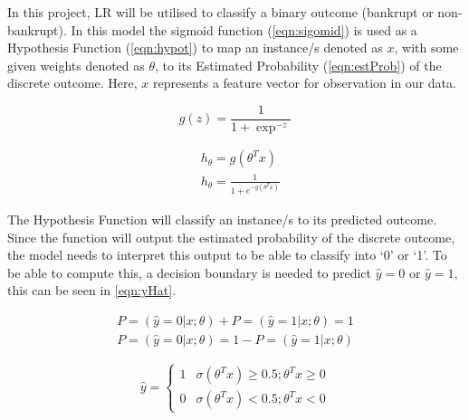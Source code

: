 In this project, LR will be utilised to classify a binary outcome (bankrupt or non-bankrupt). In this model the sigmoid function (\autoref{eqn:sigomid}) is used as a Hypothesis Function (\autoref{eqn:hypot}) to map an instance/s denoted as $x$, with some given weights denoted as $\theta$, to its Estimated Probability (\autoref{eqn:estProb}) of the discrete outcome. 
Here, $x$ represents a feature vector for observation in our data.

\begin{equation}
\label{eqn:sigomid}
g(z)=\frac{1}{1+\exp ^{-z}}
\end{equation}

\begin{equation}
\label{eqn:hypot}
\begin{aligned}
&h_{\theta}=g\left(\theta^{T} x\right)\\
&h_{\theta}=\frac{1}{1+e^{-g\left(\theta^{T} x\right)}}
\end{aligned}
\end{equation}

The Hypothesis Function will classify an instance/s to its predicted outcome. Since the function will output the estimated probability of the discrete outcome, the model needs to interpret this output to be able to classify into `0' or `1'. To be able to compute this, a decision boundary is needed to predict $\hat{y} = 0$ or $\hat{y} = 1$, this can be seen in \autoref{eqn:yHat}. 

\begin{equation}
\label{eqn:estProb}
\begin{array}{l}
P=(\hat{y}=0 | x ; \theta)+P=(\hat{y}=1 | x ; \theta)=1 \\
P=(\hat{y}=0 | x ; \theta)=1-P=(\hat{y}=1 | x ; \theta)
\end{array}
\end{equation}

\begin{equation}
\label{eqn:yHat}
\hat{y}=\left\{\begin{array}{ll}
1 & \sigma\left(\theta^{T} x\right) \geq 0.5 ; \theta^{T} x \geq 0 \\
0 & \sigma\left(\theta^{T} x\right)<0.5 ; \theta^{T} x<0
\end{array}\right.
\end{equation}


